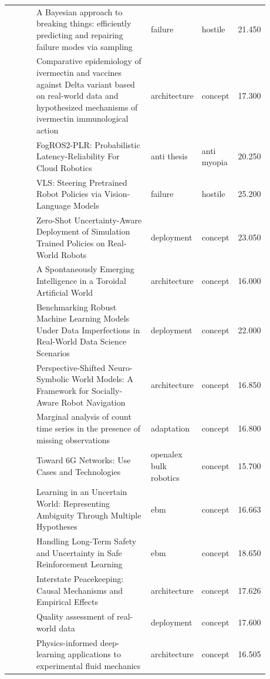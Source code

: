 \documentclass{article}
\begin{document}
\begin{center}
\begin{longtable}{p{0.12\linewidth}p{0.48\linewidth}p{0.14\linewidth}p{0.14\linewidth}r}
\citep{pool88_24} & A Bayesian approach to breaking things: efficiently predicting and repairing failure modes via sampling & failure & hostile & 21.450\\
\citep{pool88_25} & Comparative epidemiology of ivermectin and vaccines against Delta variant based on real-world data and hypothesized mechanisms of ivermectin immunological action & architecture & concept & 17.300\\
\citep{pool88_26} & FogROS2-PLR: Probabilistic Latency-Reliability For Cloud Robotics & anti thesis & anti myopia & 20.250\\
\citep{pool88_27} & VLS: Steering Pretrained Robot Policies via Vision-Language Models & failure & hostile & 25.200\\
\citep{pool88_28} & Zero-Shot Uncertainty-Aware Deployment of Simulation Trained Policies on Real-World Robots & deployment & concept & 23.050\\
\citep{pool88_29} & A Spontaneously Emerging Intelligence in a Toroidal Artificial World & architecture & concept & 16.000\\
\citep{pool88_30} & Benchmarking Robust Machine Learning Models Under Data Imperfections in Real-World Data Science Scenarios & deployment & concept & 22.000\\
\citep{pool88_31} & Perspective-Shifted Neuro-Symbolic World Models: A Framework for Socially-Aware Robot Navigation & architecture & concept & 16.850\\
\citep{pool88_32} & Marginal analysis of count time series in the presence of missing observations & adaptation & concept & 16.800\\
\citep{pool88_33} & Toward 6G Networks: Use Cases and Technologies & openalex bulk robotics & concept & 15.700\\
\citep{pool88_34} & Learning in an Uncertain World: Representing Ambiguity Through Multiple Hypotheses & ebm & concept & 16.663\\
\citep{pool88_35} & Handling Long-Term Safety and Uncertainty in Safe Reinforcement Learning & ebm & concept & 18.650\\
\citep{pool88_36} & Interstate Peacekeeping: Causal Mechanisms and Empirical Effects & architecture & concept & 17.626\\
\citep{pool88_37} & Quality assessment of real-world data & deployment & concept & 17.600\\
\citep{pool88_38} & Physics-informed deep-learning applications to experimental fluid mechanics & architecture & concept & 16.505\\

\end{longtable}
\end{center}
\end{document}
